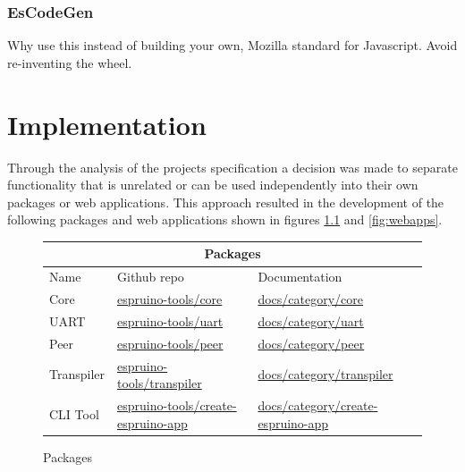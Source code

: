 \documentclass{l4proj}
\begin{document}
\subsection{EsCodeGen }
\text Why use this instead of building your own, Mozilla standard for Javascript. Avoid re-inventing the wheel.
\chapter{Implementation}

\text Through the analysis of the projects specification a decision was made to separate functionality that is unrelated or can be used independently into their own packages or web applications. This approach resulted in the development of the following packages and web applications shown in figures \ref{fig:packages} and \ref{fig:webapps}.

\begin{figure}[!ht]
    
\begin{center}
\begin{tabular}{|p{2.25cm}|p{5.25cm}|p{5.25cm}|}
 \hline
 \multicolumn{3}{|c|}{Packages} \\
 \hline
 Name  & Github repo& Documentation\\
 \hline
Core & \href{https://github.com/espruino-tools/core}{espruino-tools/core}  & \href{https://documentation-xi-liard.vercel.app/docs/category/core}{docs/category/core}  \\

UART & \href{https://github.com/espruino-tools/uart}{espruino-tools/uart}  & \href{https://documentation-xi-liard.vercel.app/docs/category/uart}{docs/category/uart}  \\

Peer & \href{https://github.com/espruino-tools/peer}{espruino-tools/peer}  & \href{https://documentation-xi-liard.vercel.app/docs/category/peer}{docs/category/peer}  \\

Transpiler & \href{https://github.com/espruino-tools/transpiler}{espruino-tools/transpiler}  & \href{https://documentation-xi-liard.vercel.app/docs/category/transpiler}{docs/category/transpiler}  \\

CLI Tool &  \href{https://github.com/espruino-tools/create-espruino-app}{espruino-tools/create-espruino-app}  & \href{https://documentation-xi-liard.vercel.app/docs/category/create-espruino-app}{docs/category/create-espruino-app}  \\
 \hline
\end{tabular}
\end{center} 
    \caption{Packages}
    \label{fig:packages}
\end{figure}
\end{document}
